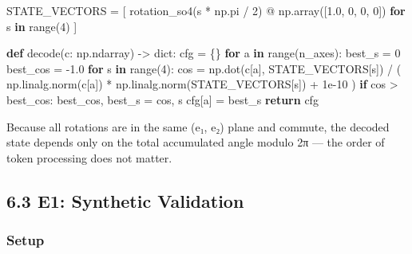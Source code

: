 \documentclass[
  twocolumn,
  10pt,
  a4paper]{article}
\newenvironment{Shaded}{}{}
\newcommand{\BuiltInTok}[1]{\textcolor[rgb]{0.00,0.50,0.00}{#1}}
\newcommand{\ControlFlowTok}[1]{\textcolor[rgb]{0.00,0.44,0.13}{\textbf{#1}}}
\newcommand{\DecValTok}[1]{\textcolor[rgb]{0.25,0.63,0.44}{#1}}
\newcommand{\FloatTok}[1]{\textcolor[rgb]{0.25,0.63,0.44}{#1}}
\newcommand{\KeywordTok}[1]{\textcolor[rgb]{0.00,0.44,0.13}{\textbf{#1}}}
\newcommand{\NormalTok}[1]{#1}
\newcommand{\OperatorTok}[1]{\textcolor[rgb]{0.40,0.40,0.40}{#1}}
\begin{document}
\begin{Shaded}
\begin{Highlighting}[]
\NormalTok{STATE\_VECTORS }\OperatorTok{=}\NormalTok{ [}
\NormalTok{    rotation\_so4(s }\OperatorTok{*}\NormalTok{ np.pi }\OperatorTok{/} \DecValTok{2}\NormalTok{) }\OperatorTok{@}\NormalTok{ np.array([}\FloatTok{1.0}\NormalTok{, }\DecValTok{0}\NormalTok{, }\DecValTok{0}\NormalTok{, }\DecValTok{0}\NormalTok{])}
    \ControlFlowTok{for}\NormalTok{ s }\KeywordTok{in} \BuiltInTok{range}\NormalTok{(}\DecValTok{4}\NormalTok{)}
\NormalTok{]}

\KeywordTok{def}\NormalTok{ decode(c: np.ndarray) }\OperatorTok{{-}\textgreater{}} \BuiltInTok{dict}\NormalTok{:}
\NormalTok{    cfg }\OperatorTok{=}\NormalTok{ \{\}}
    \ControlFlowTok{for}\NormalTok{ a }\KeywordTok{in} \BuiltInTok{range}\NormalTok{(n\_axes):}
\NormalTok{        best\_s }\OperatorTok{=} \DecValTok{0}
\NormalTok{        best\_cos }\OperatorTok{=} \OperatorTok{{-}}\FloatTok{1.0}
        \ControlFlowTok{for}\NormalTok{ s }\KeywordTok{in} \BuiltInTok{range}\NormalTok{(}\DecValTok{4}\NormalTok{):}
\NormalTok{            cos }\OperatorTok{=}\NormalTok{ np.dot(c[a], STATE\_VECTORS[s]) }\OperatorTok{/}\NormalTok{ (}
\NormalTok{                np.linalg.norm(c[a]) }\OperatorTok{*}\NormalTok{ np.linalg.norm(STATE\_VECTORS[s]) }\OperatorTok{+} \FloatTok{1e{-}10}
\NormalTok{            )}
            \ControlFlowTok{if}\NormalTok{ cos }\OperatorTok{\textgreater{}}\NormalTok{ best\_cos:}
\NormalTok{                best\_cos, best\_s }\OperatorTok{=}\NormalTok{ cos, s}
\NormalTok{        cfg[a] }\OperatorTok{=}\NormalTok{ best\_s}
    \ControlFlowTok{return}\NormalTok{ cfg}
\end{Highlighting}
\end{Shaded}

Because all rotations are in the same (e₁, e₂) plane and commute, the
decoded state depends only on the total accumulated angle modulo 2π ---
the order of token processing does not matter.

\hypertarget{e1-synthetic-validation}{%
\subsection{6.3 E1: Synthetic
Validation}\label{e1-synthetic-validation}}

\hypertarget{setup}{%
\subsubsection{Setup}\label{setup}}
\end{document}

